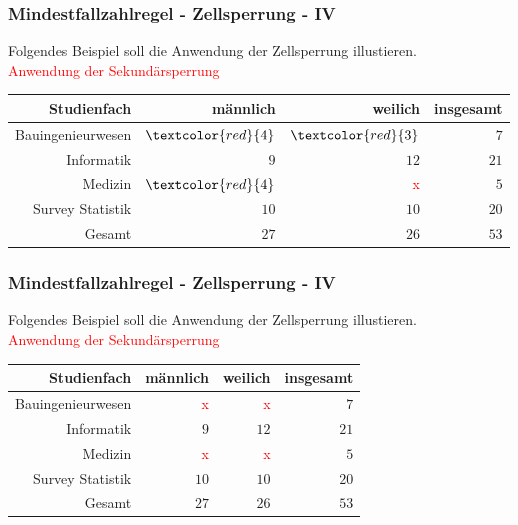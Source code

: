 \documentclass[aspectratio=169]{beamer}
\begin{document}
\begin{frame}
    \frametitle{Mindestfallzahlregel - Zellsperrung - IV}
    Folgendes Beispiel soll die Anwendung der Zellsperrung illustieren. \\
    \textcolor{red}{Anwendung der Sekundärsperrung}
    \begin{center}
        \begin{tabular}{ r r r r }
         \textbf{Studienfach} \vline & \textbf{männlich} & \textbf{weilich} & \textbf{insgesamt} \\ 
         \hline
         Bauingenieurwesen \vline & $\textcolor{red}{4}$ & $\textcolor{red}{3}$ & $7$ \\
         Informatik \vline & $9$ & $12$ & $21$ \\  
         Medizin \vline & $\textcolor{red}{4}$ & \textcolor{red}{x} & $5$ \\
         Survey Statistik \vline & $10$ & $10$ & $20$ \\
         \hline
         Gesamt \vline & $27$ & $26$ & $53$
        \end{tabular}
    \end{center}
\end{frame}


\begin{frame}
    \frametitle{Mindestfallzahlregel - Zellsperrung - IV}
    Folgendes Beispiel soll die Anwendung der Zellsperrung illustieren. \\
    \textcolor{red}{Anwendung der Sekundärsperrung}
    \begin{center}
        \begin{tabular}{ r r r r }
         \textbf{Studienfach} \vline & \textbf{männlich} & \textbf{weilich} & \textbf{insgesamt} \\ 
         \hline
         Bauingenieurwesen \vline & \textcolor{red}{x} & \textcolor{red}{x} & $7$ \\
         Informatik \vline & $9$ & $12$ & $21$ \\  
         Medizin \vline & \textcolor{red}{x} & \textcolor{red}{x} & $5$ \\
         Survey Statistik \vline & $10$ & $10$ & $20$ \\
         \hline
         Gesamt \vline & $27$ & $26$ & $53$
        \end{tabular}
    \end{center}
\end{frame}
\end{document}

